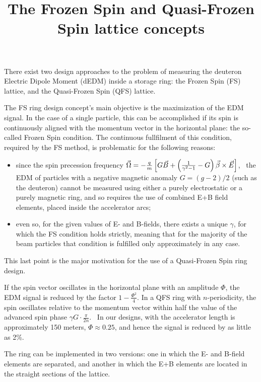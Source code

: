 \documentclass{article}
\newcommand{\W}{\Omega}
\begin{document}
\title{The Frozen Spin and Quasi-Frozen Spin lattice concepts}
There exist two design approaches to the problem of measuring the deuteron Electric Dipole Moment (dEDM) inside a storage ring: the Frozen Spin (FS) lattice, and the Quasi-Frozen Spin (QFS) lattice.

The FS ring design concept's main objective is the maximization of the EDM signal. In the case of a single particle, this can be accomplished if its spin is continuously aligned with the momentum vector in the horizontal plane: the so-called Frozen Spin condition. The continuous fullfilment of this condition, required by the FS method, is problematic for the following reasons:
\begin{itemize}
\item since the spin precession frequency $\vec\W = -\frac{q}{m}\bkt*{G\vec B + \bkt{\frac{1}{\gamma^2-1}-G}\vec\beta\times\vec E}$,~\cite{JEDI:SpinTuneMapping} the EDM of particles with a negative magnetic anomaly $G = (g-2)/2$ (such as the deuteron) cannot be measured using either a purely electrostatic or a purely magnetic ring, and so requires the use of combined E+B field elements, placed inside the accelerator arcs;
\item even so, for the given values of E- and B-fields, there exists a unique $\gamma$, for which the FS condition holds strictly, meaning that for the majority of the beam particles that condition is fulfilled only approximately in any case.
\end{itemize}
This last point is the major motivation for the use of a Quasi-Frozen Spin ring design.

If the spin vector oscillates in the horizontal plane with an amplitude $\Phi$, the EDM signal is reduced by the factor $1 - \frac{\Phi^2}{4}$. In a QFS ring with $n$-periodicity, the spin oscillates relative to the momentum vector within half the value of the advanced spin phase $\gamma G \cdot \frac{\pi}{2n}$.~\cite{Senichev:Shanghai} In our designs, with the accelerator length is approximately 150 meters, $\Phi\approx 0.25$, and hence the signal is reduced by as little as 2\%.

The ring can be implemented in two versions: one in which the E- and B-field elements are separated, and another in which the E+B elements are located in the straight sections of the lattice.
\end{document}
